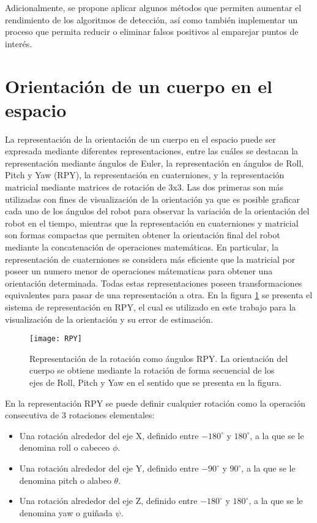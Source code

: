 Adicionalmente, se propone aplicar algunos métodos que permiten aumentar el rendimiento de los algoritmos de detección, así como también implementar un proceso que permita reducir o eliminar falsos positivos al emparejar puntos de interés. 

\section{ Orientación de un cuerpo en el espacio}

La representación de la orientación de un cuerpo en el espacio puede ser expresada mediante diferentes representaciones, entre las cuáles se destacan la representación mediante ángulos de Euler,  la representación en ángulos de Roll, Pitch y Yaw (RPY), la representación en cuaterniones, y la representación  matricial mediante matrices de rotación de 3x3. Las dos primeras son más utilizadas con fines de visualización de la orientación ya que es posible graficar cada uno de los ángulos del robot para observar la variación de la orientación del robot en el tiempo, mientras que la representación en cuaterniones y matricial son formas compactas que permiten obtener la orientación final del robot mediante la concatenación de operaciones matemáticas. En particular, la representación de cuaterniones se considera más eficiente que la matricial por poseer un numero menor de operaciones mátematicas para obtener una  orientación determinada. Todas estas representaciones poseen transformaciones equivalentes para pasar de una representación a otra. En la figura \ref{imagen:rpy} se presenta el sistema de representación en RPY, el cual es utilizado en este trabajo para la visualización de la orientación y su error de estimación.


\begin{figure}[H]
	\centering
	\texttt{[image: RPY]}
	\caption[Representación de la rotación como ángulos  RPY]{Representación de la rotación como ángulos RPY. La orientación del cuerpo se obtiene mediante la rotación de forma secuencial de los ejes de Roll, Pitch y Yaw en el sentido que se presenta en la figura.}
	\label{imagen:rpy}
\end{figure} 

En la representación RPY se puede definir cualquier rotación como la operación consecutiva de 3 rotaciones elementales:



\begin{itemize}
	\item Una rotación alrededor del eje X, definido entre ${-180}^{\circ }$ y ${180}^{\circ }$, a la que se le denomina roll o cabeceo $ \phi$. 
	\item Una rotación alrededor del eje Y, definido entre ${-90}^{\circ }$ y  ${90}^{\circ }$, a la que se le denomina pitch o alabeo $\theta$.
	\item Una rotación alrededor del eje Z, definido entre ${-180}^{\circ }$ y ${180}^{\circ }$, a la que se le denomina yaw o guiñada $\psi$.
	
	
\end{itemize}


